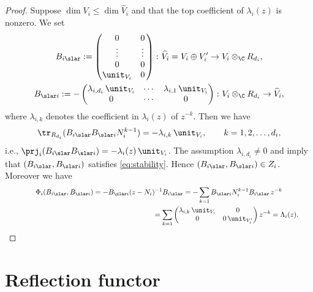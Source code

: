 \begin{proof}
Suppose $\dim V_i \leq \dim \widehat{V}_i$
and that the top coef\/f\/icient of $\lambda_i(z)$ is nonzero. We set
\begin{gather*}
B_{i \slar}  := \begin{pmatrix}
0 & 0\, \\ \vdots & \vdots\, \\ 0 & 0\, \\ \unit_{V_i} & 0\,
\end{pmatrix}
\colon \widehat{V}_i = V_i \oplus V'_i \to V_i \otimes_\C R_{d_i}, \\
B_{\slar i}  := - \begin{pmatrix}
\lambda_{i,d_i}\,\unit_{V_i} & \cdots & \lambda_{i,1}\,\unit_{V_i} \\
0 & \cdots & 0
\end{pmatrix}
\colon V_i \otimes_\C R_{d_i} \to \widehat{V}_i,
\end{gather*}
where $\lambda_{i,k}$ denotes the coef\/f\/icient in $\lambda_i(z)$ of $z^{-k}$.
Then we have
\[
\tr_{R_{d_i}}(B_{i \slar}  B_{\slar i} N_i^{k-1})
= -\lambda_{i,k}\,\unit_{V_i}, \qquad k=1,2, \dots ,d_i,
\]
i.e., $\prj_i(B_{i \slar}  B_{\slar i})=-\lambda_i(z)\,\unit_{V_i}$.
The assumption $\lambda_{i,d_i} \neq 0$ and
 imply that
$(B_{i \slar},B_{\slar i})$ satisf\/ies \eqref{eq:stability}.
Hence $(B_{i \slar},B_{\slar i}) \in Z_i$.
Moreover we have
\begin{gather*}
\Phi_i(B_{i \slar},B_{\slar i})=
-B_{\slar i}(z-N_i)^{-1}B_{i \slar}  =
-\sum_{k=1}B_{\slar i}N_i^{k-1}B_{i \slar}\,z^{-k} \\
\hphantom{\Phi_i(B_{i \slar},B_{\slar i})=
-B_{\slar i}(z-N_i)^{-1}B_{i \slar}}{}
=\sum_{k=1}
\begin{pmatrix}
\lambda_{i,k}\,\unit_{V_i} & 0 \\
0 & 0\,\unit_{V'_i} \end{pmatrix} z^{-k} = \Lambda_i(z).\tag*{\qed}
\end{gather*}
\renewcommand{\qed}{}
\end{proof}

\section{Ref\/lection functor}\label{sec:reflection}

